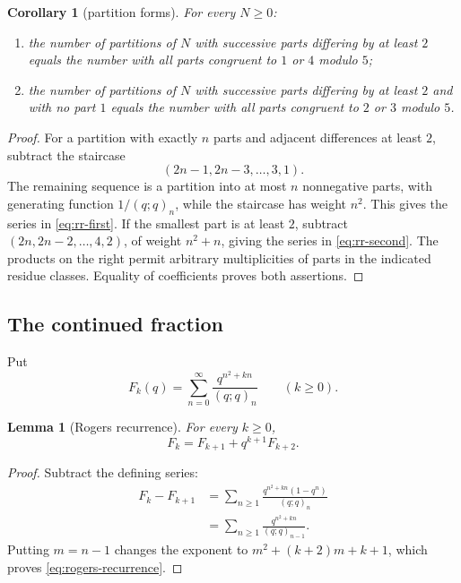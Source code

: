 \documentclass[11pt,oneside]{article}
\newtheorem{lemma}[theorem]{Lemma}
\newtheorem{corollary}[theorem]{Corollary}
\theoremstyle{definition}
\begin{document}
\begin{corollary}[partition forms]\label{cor:rr-partitions}
For every $N\ge0$:
\begin{enumerate}[label=\textup{(\roman*)}]
\item the number of partitions of $N$ with successive parts differing by
      at least $2$ equals the number with all parts congruent to
      $1$ or $4$ modulo $5$;
\item the number of partitions of $N$ with successive parts differing by
      at least $2$ and with no part $1$ equals the number with all parts
      congruent to $2$ or $3$ modulo $5$.
\end{enumerate}
\end{corollary}

\begin{proof}
For a partition with exactly $n$ parts and adjacent differences at least
$2$, subtract the staircase
\[
 (2n-1,2n-3,\ldots,3,1).
\]
The remaining sequence is a partition into at most $n$ nonnegative parts,
with generating function $1/(q;q)_n$, while the staircase has weight
$n^2$.  This gives the series in \eqref{eq:rr-first}.  If the smallest
part is at least $2$, subtract
$(2n,2n-2,\ldots,4,2)$, of weight $n^2+n$, giving the series in
\eqref{eq:rr-second}.  The products on the right permit arbitrary
multiplicities of parts in the indicated residue classes.  Equality of
coefficients proves both assertions.
\end{proof}

\subsection{The continued fraction}

Put
\begin{equation}\label{eq:Fk}
 F_k(q)=\sum_{n=0}^{\infty}\frac{q^{n^2+kn}}{(q;q)_n}
 \qquad(k\ge0).
\end{equation}

\begin{lemma}[Rogers recurrence]\label{lem:rogers-recurrence}
For every $k\ge0$,
\begin{equation}\label{eq:rogers-recurrence}
 F_k=F_{k+1}+q^{k+1}F_{k+2}.
\end{equation}
\end{lemma}

\begin{proof}
Subtract the defining series:
\begin{align*}
 F_k-F_{k+1}
 &=\sum_{n\ge1}
 \frac{q^{n^2+kn}(1-q^n)}{(q;q)_n}\\
 &=\sum_{n\ge1}\frac{q^{n^2+kn}}{(q;q)_{n-1}}.
\end{align*}
Putting $m=n-1$ changes the exponent to
$m^2+(k+2)m+k+1$, which proves \eqref{eq:rogers-recurrence}.
\end{proof}
\end{document}
